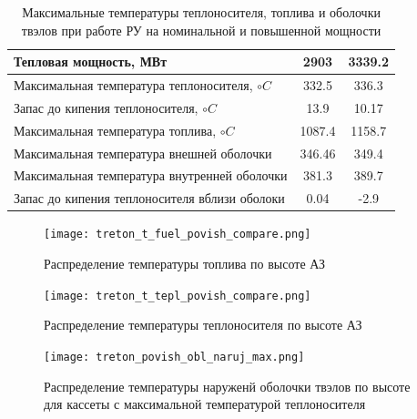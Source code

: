 \begin{table}[H]
    \caption{Максимальные температуры теплоносителя, топлива и оболочки твэлов при работе РУ на номинальной и повышенной мощности}
    \begin{center}
        \begin{tabular}{|l|c|c|}
        \toprule
        Тепловая мощность, МВт & 2903 & 3339.2 \\
        \midrule
        \hline
        Максимальная температура теплоносителя, $\circ C$ & 332.5 & 336.3  \\ 
        \hline
        Запас до кипения теплоносителя, $\circ C$ & 13.9 &  10.17 \\
        \hline
        Максимальная температура топлива, $\circ C$ & 1087.4 & 1158.7  \\
        \hline
        Максимальная температура внешней оболочки & 346.46 & 349.4 \\
        \hline
        Максимальная температура внутренней оболочки & 381.3 & 389.7 \\
        \hline
        Запас до кипения теплоносителя вблизи оболоки & 0.04 & -2.9 \\
        \bottomrule
        \end{tabular}
		\label{tabular:t_max_nominal_compare}
    \end{center}
\end{table}

\begin{figure}[H]
	\begin{center}
		\texttt{[image: treton\_t\_fuel\_povish\_compare.png]}
		\caption{Распределение температуры топлива по высоте АЗ}
		\label{pic:treton-t-fuel-povish-compare} %
	\end{center}
\end{figure}

\begin{figure}[H]
	\begin{center}
		\texttt{[image: treton\_t\_tepl\_povish\_compare.png]}
		\caption{Распределение температуры теплоносителя по высоте АЗ}
		\label{pic:treton-t-tepl-povish-compare} %
	\end{center}
\end{figure}

\begin{figure}[H]
	\begin{center}
		\texttt{[image: treton\_povish\_obl\_naruj\_max.png]}
		\caption{Распределение температуры наруженй оболочки твэлов по высоте для кассеты с максимальной температурой теплоносителя}
		\label{pic:treton-povish-obl-naruj-max} %
	\end{center}
\end{figure}

